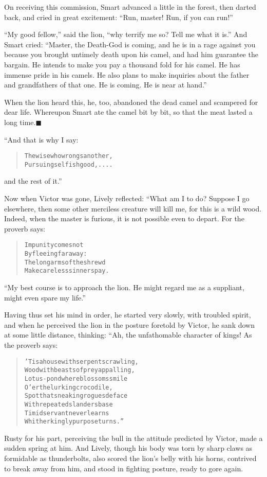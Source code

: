 \documentclass[article, twoside, 14pt]{memoir}
\newcommand{\qed}{\hfill \ensuremath{\blacksquare}}
\renewenvironment{verbatim}{%
\begin{quote}%
\vskip -10pt%
\begin{alltt}\normalfont\large}{\end{alltt}%
\end{quote}%
\vskip -10pt
} %
\begin{document}
On receiving this commission, Smart advanced a little in the
forest, then darted back, and cried in great excitement:
``Run, master! Run, if you can run!''

``My good fellow,'' said the lion,
``why terrify me so? Tell me what it is.'' And Smart cried:
``Master, the Death-God is coming, and he is in a rage against you because you brought untimely death upon his camel, and had him guarantee the bargain. He intends to make you pay a thousand fold for his camel. He has immense pride in his camels. He also plans to make inquiries about the father and grandfathers of that one. He is coming. He is near at hand.''

When the lion heard this, he, too, abandoned the dead camel and
scampered for dear life. Whereupon Smart ate the camel bit by bit,
so that the meat lasted a long time.\hyperref[s24]{\qed}

“And that is why I say:

\begin{verbatim}
The wise who wrongs another,
    Pursuing selfish good, ....
\end{verbatim}
and the rest of it.”

Now when Victor was gone, Lively reflected: “What am I to do?
Suppose I go elsewhere, then some other merciless creature will
kill me, for this is a wild wood. Indeed, when the master is
furious, it is not possible even to depart. For the proverb says:

\begin{verbatim}
Impunity comes not
    By fleeing far away:
The long arms of the shrewd
    Make careless sinners pay.
\end{verbatim}
``My best course is to approach the lion. He might regard me as a suppliant, might even spare my life.''

Having thus set his mind in order, he started very slowly,
with troubled spirit, and when he perceived the lion in the posture
foretold by Victor, he sank down at some little distance, thinking:
“Ah, the unfathomable character of kings! As the proverb says:

\begin{verbatim}
'Tis a house with serpents crawling,
Wood with beasts of prey appalling,
Lotus-pond where blossoms smile
O'er the lurking crocodile,
Spot that sneaking rogues deface
With repeated slanders base{\textemdash}
Timid servant never learns
Whither kingly purpose turns.”
\end{verbatim}
Rusty for his part, perceiving the bull in the attitude predicted
by Victor, made a sudden spring at him. And Lively, though his body
was torn by sharp claws as formidable as thunderbolts, also scored
the lion's belly with his horns, contrived to break away from him,
and stood in fighting posture, ready to gore again.
\end{document}
